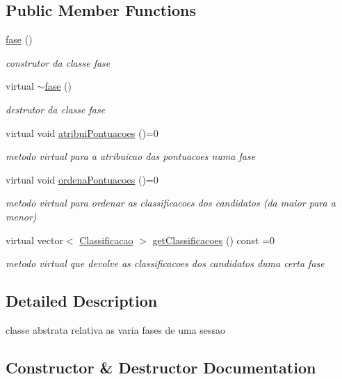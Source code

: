 \subsection*{Public Member Functions}
\begin{DoxyCompactItemize}
\item 
\hyperlink{classfase_aa083a44106dfc979915f9e9ffb78f206}{fase} ()
\begin{DoxyCompactList}\small\item\em construtor da classe fase \end{DoxyCompactList}\item 
virtual \hyperlink{classfase_a84ce4001850cdcf2c001feb38bc65a47}{$\sim$fase} ()
\begin{DoxyCompactList}\small\item\em destrutor da classe fase \end{DoxyCompactList}\item 
virtual void \hyperlink{classfase_af940cf6e1b3aaff1802f354d82d73208}{atribui\+Pontuacoes} ()=0
\begin{DoxyCompactList}\small\item\em metodo virtual para a atribuicao das pontuacoes numa fase \end{DoxyCompactList}\item 
virtual void \hyperlink{classfase_af0597909e632b43fb33f2b49f66280e1}{ordena\+Pontuacoes} ()=0
\begin{DoxyCompactList}\small\item\em metodo virtual para ordenar as classificacoes dos candidatos (da maior para a menor) \end{DoxyCompactList}\item 
virtual vector$<$ \hyperlink{structClassificacao}{Classificacao} $>$ \hyperlink{classfase_a44cb191d58429a075bd3820e847c2823}{get\+Classificacoes} () const =0
\begin{DoxyCompactList}\small\item\em metodo virtual que devolve as classificacoes dos candidatos duma certa fase \end{DoxyCompactList}\end{DoxyCompactItemize}


\subsection{Detailed Description}
classe abstrata relativa as varia fases de uma sessao 

\subsection{Constructor \& Destructor Documentation}
